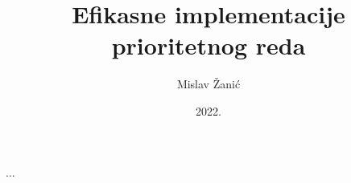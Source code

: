 \documentclass[a4paper,twoside,12pt]{memoir} %
\title{Efikasne implementacije prioritetnog reda}
\author{Mislav \v{Z}ani\'c}
\date{2022.}  %
\begin{document}
\frontmatter


\begin{intro}
...
\end{intro}











\end{document}
